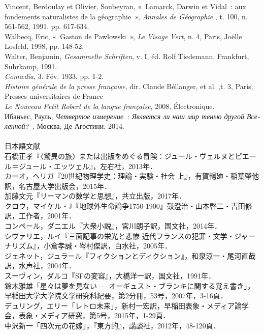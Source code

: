 Vincent, Berdoulay et Olivier, Soubeyran, «~Lamarck, Darwin et Vidal~: aux fondements naturalistes de la géographie~», \emph{Annales de Géographie} , t. 100, n. 561-562, 1991, pp. 617-634.\\
Walbecq, Eric, «~Gaston de Pawlowski~», \emph{Le Visage Vert}, n. 4, Paris, Joëlle Losfeld, 1998, pp. 148-52.\\
Walter, Benjamin, \emph{Gesammelte Schriften}, v. I, éd. Rolf Tiedemann, Frankfurt, Suhrkamp, 1991.\\
\emph{Comœdia}, 3. Fév. 1933, pp. 1-2.\\
\emph{Histoire générale de la presse française}, dir. Claude Béllanger, et al. ,t. 3, Paris, Presses universitaires de France\\
\emph{Le Nouveau Petit Robert de la langue française}, 2008, Électronique.\\
\foreignlanguage{russian}{Ибаньес, Рауль, \emph{Четвертое измерение~: Является ли наш мир тенью другой Вселенной?~}, Москва, Де Агостини}, 2014.\\
\\
{\large 日本語文献}\\
石橋正孝『〈驚異の旅〉または出版をめぐる冒険：ジュール・ヴェルヌとピエール＝ジュール・エッツェル』，左右社，2013年．\\
カーオ，ヘリガ『20世紀物理学史：理論・実験・社会 上』，有賀暢廸・稲葉肇他訳，名古屋大学出版会，2015年．\\
加藤文元『リーマンの数学と思想』，共立出版，2017年．\\
クロウ，マイケル・J『地球外生命論争1750-1900』鼓澄治・山本啓二・吉田修訳，工作者，2001年．\\
コンペール，ダニエル『大衆小説』，宮川朗子訳，国文社，2014年．\\
シヴァリエ，ルイ『三面記事の栄光と悲惨 近代フランスの犯罪・文学・ジャーナリズム』，小倉孝誠・岑村傑訳，白水社，2005年．\\
ジェネット，ジュラール『フィクションとディクション』，和泉涼一・尾河直哉訳，水声社，2004年．\\
スーヴィン，ダルコ『SFの変容』，大橋洋一訳，国文社，1991年．\\
鈴木雅雄「星々は夢を見ない --- オーギュスト・ブランキに関する覚え書き」，早稲田大学大学院文学研究科紀要，第2分冊，53号，2007年，3-16頁．\\
デュリング，エリー「レトロ未来」，新村一宏訳，早稲田表象・メディア論学会，表象・メディア研究，第5号，2015年，1-29頁．\\
中沢新一「四次元の花嫁」，『東方的』，講談社，2012年，48-120頁．\\
